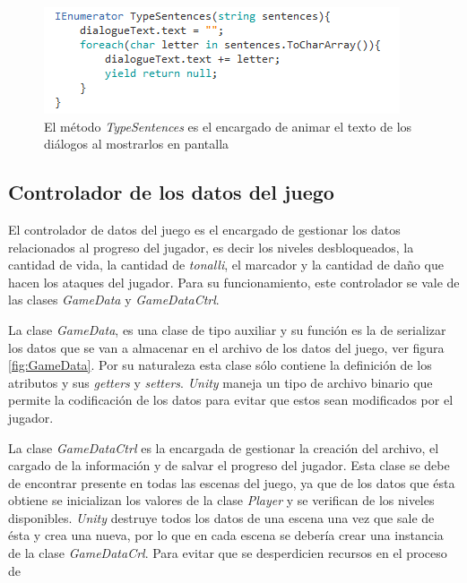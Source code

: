     \begin{figure}[h]
        \centering
        \includegraphics[height=0.15 \textheight]{03TrabajoRealizado/imagenes/dialogueController02.png}
        \caption{El método \textit{TypeSentences} es el encargado de animar el texto de los diálogos al mostrarlos en pantalla}
        \label{fig:DialoguesCtrl}
    \end{figure}

\subsection{Controlador de los datos del juego}
El controlador de datos del juego es el encargado de gestionar los datos
relacionados al progreso del jugador, es decir los niveles desbloqueados, la
cantidad de vida, la cantidad de \textit{tonalli}, el marcador y la cantidad de
daño que hacen los ataques del jugador. Para su funcionamiento, este controlador
se vale de las clases \textit{GameData} y \textit{GameDataCtrl}.
\\
\par
La clase \textit{GameData}, es una clase de tipo auxiliar y su función es la de
serializar los datos que se van a almacenar en el archivo de los datos del
juego, ver figura \ref{fig:GameData}. Por su naturaleza esta clase sólo contiene
la definición de los atributos y sus \textit{getters} y \textit{setters}.
\textit{Unity} maneja un tipo de archivo binario que permite la codificación de
los datos para evitar que estos sean modificados por el jugador.
\\
\par
La clase \textit{GameDataCtrl} es la encargada de gestionar la creación del
archivo, el cargado de la información y de salvar el progreso del jugador. Esta
clase se debe de encontrar presente en todas las escenas del juego, ya que de
los datos que ésta obtiene se inicializan los valores de la clase
\textit{Player} y se verifican de los niveles disponibles. \textit{Unity}
destruye todos los datos de una escena una vez que sale de ésta y crea una
nueva, por lo que en cada escena se debería crear una instancia de la clase
\textit{GameDataCrl}. Para evitar que se desperdicien recursos en el proceso de
